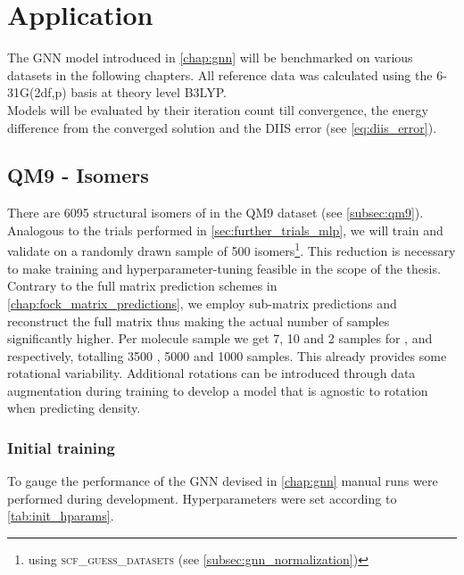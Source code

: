 \chapter{Application}
\label{chap:application}
The GNN model introduced in \autoref{chap:gnn} will be benchmarked on various datasets in the following chapters. All reference data was calculated using the 6-31G(2df,p) basis at theory level B3LYP. \\

Models will be evaluated by their iteration count till convergence, the energy difference from the converged solution and the DIIS error (see \autoref{eq:diis_error}). 

\section{QM9 -  Isomers}
\label{sec:qm9_isomers_benchmark}
There are 6095 structural isomers of  in the QM9 dataset (see \autoref{subsec:qm9}). Analogous to the trials performed in \autoref{sec:further_trials_mlp}, we will train and validate on a randomly drawn sample of 500 isomers\footnote{using \textsc{scf\_guess\_datasets} (see \autoref{subsec:gnn_normalization})}. This reduction is necessary to make training and hyperparameter-tuning feasible in the scope of the thesis. Contrary to the full matrix prediction schemes in \autoref{chap:fock_matrix_predictions}, we employ sub-matrix predictions and reconstruct the full matrix thus making the actual number of samples significantly higher. Per molecule sample we get 7, 10 and 2 samples for ,  and  respectively, totalling 3500 , 5000  and 1000  samples. This already provides some rotational variability. Additional rotations can be introduced through data augmentation during training to develop a model that is agnostic to rotation when predicting density.\\

\subsection{Initial training}
\label{subsec:qm9_isomers_initial}
To gauge the performance of the GNN devised in \autoref{chap:gnn} manual runs were performed during development. Hyperparameters were set according to \autoref{tab:init_hparams}. 

